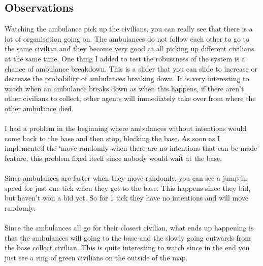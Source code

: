\documentclass[titlepage]{article}
\begin{document}
  \subsection{Observations}
    Watching the ambulance pick up the civilians, you can really see that there is a lot of organisation going on. The ambulances do not follow each other to go to the same civilian and they become very good at all picking up different civilians at the same time. One thing I added to test the robustness of the system is a chance of ambulance breakdown. This is a slider that you can slide to increase or decrease the probability of ambulances breaking down. It is very interesting to watch when an ambulance breaks down as when this happens, if there aren't other civilians to collect, other agents will immediately take over from where the other ambulance died.
    \\
    \\
    I had a problem in the beginning where ambulances without intentions would come back to the base and then stop, blocking the base. As soon as I implemented the `move-randomly when there are no intentions that can be made' feature, this problem fixed itself since nobody would wait at the base.
    \\
    \\
    Since ambulances are faster when they move randomly, you can see a jump in speed for just one tick when they get to the base. This happens since they bid, but haven't won a bid yet. So for 1 tick they have no intentions and will move randomly.
    \\
    \\
    Since the ambulances all go for their closest civilian, what ends up happening is that the ambulances will going to the base and the slowly going outwards from the base collect civilian. This is quite interesting to watch since in the end you just see a ring of green civilians on the outside of the map.
\end{document}
